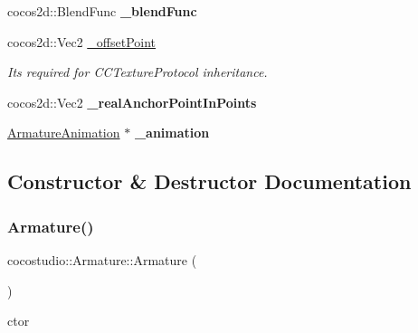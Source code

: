 \begin{DoxyCompactItemize}
\mbox{\label{classcocostudio_1_1Armature_a977585376f6c529323371db818375caf}} 
cocos2d\+::\+Blend\+Func {\bfseries \+\_\+blend\+Func}
\item 
\mbox{\label{classcocostudio_1_1Armature_a8526263a93985a96e4e19dad0ef71942}} 
cocos2d\+::\+Vec2 \hyperlink{classcocostudio_1_1Armature_a8526263a93985a96e4e19dad0ef71942}{\+\_\+offset\+Point}
\begin{DoxyCompactList}\small\item\em It\textquotesingle{}s required for C\+C\+Texture\+Protocol inheritance. \end{DoxyCompactList}\item 
\mbox{\label{classcocostudio_1_1Armature_aac574ed927a067e101e141192049f1cf}} 
cocos2d\+::\+Vec2 {\bfseries \+\_\+real\+Anchor\+Point\+In\+Points}
\item 
\mbox{\label{classcocostudio_1_1Armature_a2ee44a08ed2183ca0ca97a069ec46444}} 
\hyperlink{classcocostudio_1_1ArmatureAnimation}{Armature\+Animation} $\ast$ {\bfseries \+\_\+animation}
\end{DoxyCompactItemize}


\subsection{Constructor \& Destructor Documentation}
\mbox{\label{classcocostudio_1_1Armature_a718f247b339d19f4159b9abf847826aa}} 
\subsubsection{\texorpdfstring{Armature()}{Armature()}\hspace{0.1cm}{\footnotesize\ttfamily [1/2]}}
{\footnotesize\ttfamily cocostudio\+::\+Armature\+::\+Armature (\begin{DoxyParamCaption}{ }\end{DoxyParamCaption})}

ctor \mbox{\label{classcocostudio_1_1Armature_a3a94874b75c364d3cbfb604f1dd098c3}} 
